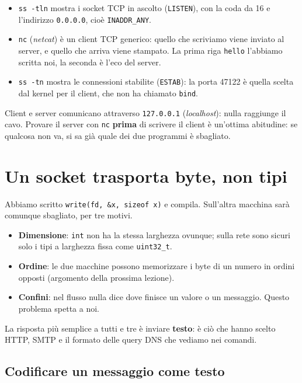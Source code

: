 \begin{itemize}
    \item \texttt{ss -tln} mostra i socket TCP in ascolto (\texttt{LISTEN}), con la coda da 16 e l'indirizzo
          \texttt{0.0.0.0}, cioè \texttt{INADDR\_ANY}.
    \item \texttt{nc} (\emph{netcat}) è un client TCP generico: quello che scriviamo viene inviato al server, e quello che
          arriva viene stampato. La prima riga \texttt{hello} l'abbiamo scritta noi, la seconda è l'eco del server.
    \item \texttt{ss -tn} mostra le connessioni stabilite (\texttt{ESTAB}): la porta 47122 è quella scelta dal kernel per
          il client, che non ha chiamato \texttt{bind}.
\end{itemize}

Client e server comunicano attraverso \texttt{127.0.0.1} (\emph{localhost}): nulla raggiunge il cavo. Provare il
server con \texttt{nc} \textbf{prima} di scrivere il client è un'ottima abitudine: se qualcosa non va, si sa già quale dei
due programmi è sbagliato.

\section{Un socket trasporta byte, non tipi}

Abbiamo scritto \texttt{write(fd, \&x, sizeof x)} e compila. Sull'altra macchina sarà comunque sbagliato, per tre motivi.
\begin{itemize}
    \item \textbf{Dimensione}: \texttt{int} non ha la stessa larghezza ovunque; sulla rete sono sicuri solo i tipi a
          larghezza fissa come \texttt{uint32\_t}.
    \item \textbf{Ordine}: le due macchine possono memorizzare i byte di un numero in ordini opposti (argomento della
          prossima lezione).
    \item \textbf{Confini}: nel flusso nulla dice dove finisce un valore o un messaggio. Questo problema spetta a noi.
\end{itemize}

La risposta più semplice a tutti e tre è inviare \textbf{testo}: è ciò che hanno scelto HTTP, SMTP e il formato delle
query DNS che vediamo nei comandi.

\subsection{Codificare un messaggio come testo}

